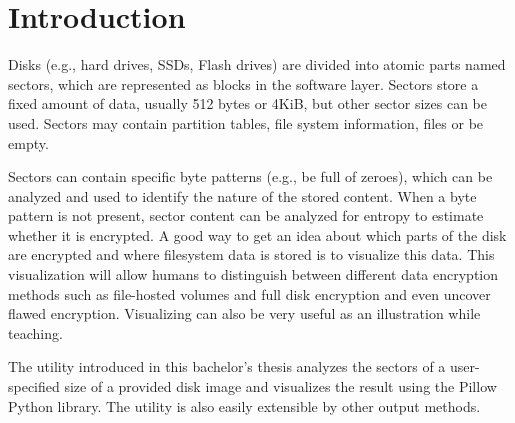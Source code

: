 \documentclass[
  digital, %
  color,   %
  oneside, %
  lof,     %
  nolot,     %
]{fithesis4}
\begin{document}

\chapter*{Introduction}
\label{chap:introduction}

Disks (e.g., hard drives, SSDs, Flash drives) are divided into atomic parts named sectors, which are represented as blocks in the software layer.
Sectors store a fixed amount of data, usually 512 bytes or 4KiB, but other sector sizes can be used.
Sectors may contain partition tables, file system information, files or be empty.

Sectors can contain specific byte patterns (e.g., be full of zeroes), which can be analyzed and used to identify the nature of the stored content.
When a byte pattern is not present, sector content can be analyzed for entropy to estimate whether it is encrypted.
A good way to get an idea about which parts of the disk are encrypted and where filesystem data is stored is to visualize this data.
This visualization will allow humans to distinguish between different data encryption methods such as file-hosted volumes and full disk encryption and even uncover flawed encryption.
Visualizing can also be very useful as an illustration while teaching.
 
The utility introduced in this bachelor's thesis analyzes the sectors of a user-specified size of a provided disk image and visualizes the result using the Pillow Python library.
The utility is also easily extensible by other output methods.
\end{document}
